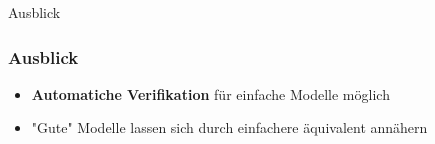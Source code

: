 \documentclass[ngerman]{beamer}
\begin{document}
\begin{section}{Ausblick}

\begin{frame}
    \frametitle{Ausblick}

    \begin{itemize}
        \item \textbf{Automatiche Verifikation} für einfache Modelle möglich
        \item "Gute" Modelle lassen sich durch einfachere äquivalent annähern
    \end{itemize}
\end{frame}

\end{section}
\end{document}
